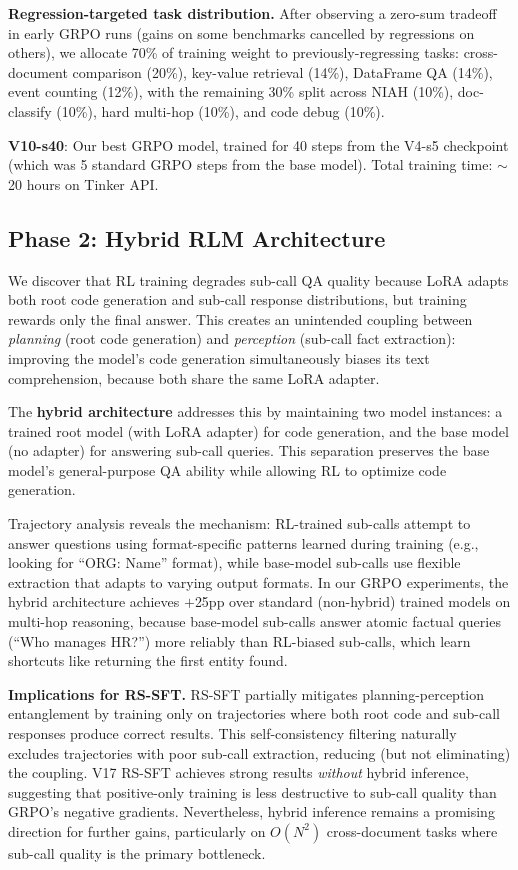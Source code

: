 \documentclass{article}
\begin{document}
\textbf{Regression-targeted task distribution.} After observing a zero-sum tradeoff in early GRPO runs (gains on some benchmarks cancelled by regressions on others), we allocate 70\% of training weight to previously-regressing tasks: cross-document comparison (20\%), key-value retrieval (14\%), DataFrame QA (14\%), event counting (12\%), with the remaining 30\% split across NIAH (10\%), doc-classify (10\%), hard multi-hop (10\%), and code debug (10\%).

\textbf{V10-s40}: Our best GRPO model, trained for 40 steps from the V4-s5 checkpoint (which was 5 standard GRPO steps from the base model). Total training time: $\sim$20 hours on Tinker API.

\subsection{Phase 2: Hybrid RLM Architecture}
\label{sec:hybrid}

We discover that RL training degrades sub-call QA quality because LoRA adapts both root code generation and sub-call response distributions, but training rewards only the final answer. This creates an unintended coupling between \emph{planning} (root code generation) and \emph{perception} (sub-call fact extraction): improving the model's code generation simultaneously biases its text comprehension, because both share the same LoRA adapter.

The \textbf{hybrid architecture} addresses this by maintaining two model instances: a trained root model (with LoRA adapter) for code generation, and the base model (no adapter) for answering sub-call queries. This separation preserves the base model's general-purpose QA ability while allowing RL to optimize code generation.

Trajectory analysis reveals the mechanism: RL-trained sub-calls attempt to answer questions using format-specific patterns learned during training (e.g., looking for ``ORG: Name'' format), while base-model sub-calls use flexible extraction that adapts to varying output formats. In our GRPO experiments, the hybrid architecture achieves $+$25pp over standard (non-hybrid) trained models on multi-hop reasoning, because base-model sub-calls answer atomic factual queries (``Who manages HR?'') more reliably than RL-biased sub-calls, which learn shortcuts like returning the first entity found.

\textbf{Implications for RS-SFT.} RS-SFT partially mitigates planning-perception entanglement by training only on trajectories where both root code and sub-call responses produce correct results. This self-consistency filtering naturally excludes trajectories with poor sub-call extraction, reducing (but not eliminating) the coupling. V17 RS-SFT achieves strong results \emph{without} hybrid inference, suggesting that positive-only training is less destructive to sub-call quality than GRPO's negative gradients. Nevertheless, hybrid inference remains a promising direction for further gains, particularly on $O(N^2)$ cross-document tasks where sub-call quality is the primary bottleneck.
\end{document}
